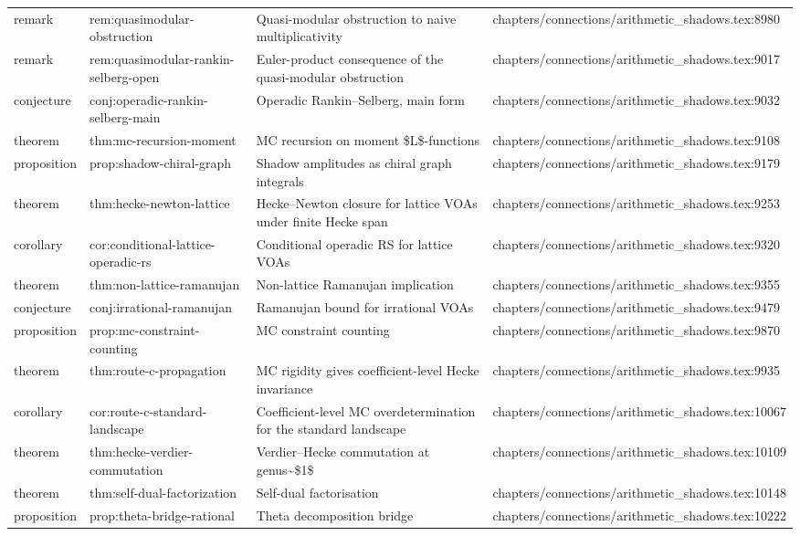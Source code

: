 \documentclass[11pt]{article}
\begin{document}
\begin{longtable}{L{0.10\textwidth}L{0.26\textwidth}L{0.42\textwidth}L{0.22\textwidth}}
remark & rem:quasimodular-obstruction & Quasi-modular obstruction to naive multiplicativity & chapters/connections/arithmetic\_shadows.tex:8980\\
remark & rem:quasimodular-rankin-selberg-op{}en & Euler-product consequence of the quasi-modular obstruction & chapters/connections/arithmetic\_shadows.tex:9017\\
conjecture & conj:operadic-rankin-selberg-main & Operadic Rankin--Selberg, main form & chapters/connections/arithmetic\_shadows.tex:9032\\
theorem & thm:mc-recursion-moment & MC recursion on moment \$L\$-functions & chapters/connections/arithmetic\_shadows.tex:9108\\
proposition & prop:shadow-chiral-graph & Shadow amplitudes as chiral graph integrals & chapters/connections/arithmetic\_shadows.tex:9179\\
theorem & thm:hecke-newton-lattice & Hecke--Newton closure for lattice VOAs under finite Hecke span & chapters/connections/arithmetic\_shadows.tex:9253\\
corollary & cor:cond{}itional-lattice-operadic-rs & Cond{}itional operadic RS for lattice VOAs & chapters/connections/arithmetic\_shadows.tex:9320\\
theorem & thm:non-lattice-ramanujan & Non-lattice Ramanujan implication & chapters/connections/arithmetic\_shadows.tex:9355\\
conjecture & conj:irrational-ramanujan & Ramanujan bound for irrational VOAs & chapters/connections/arithmetic\_shadows.tex:9479\\
proposition & prop:mc-constraint-counting & MC constraint counting & chapters/connections/arithmetic\_shadows.tex:9870\\
theorem & thm:route-c-propagation & MC rigidity gives coefficient-level Hecke invariance & chapters/connections/arithmetic\_shadows.tex:9935\\
corollary & cor:route-c-standard-landscape & Coefficient-level MC overdetermination for the standard landscape & chapters/connections/arithmetic\_shadows.tex:10067\\
theorem & thm:hecke-verdier-commutation & Verdier--Hecke commutation at genus\textasciitilde{}\$1\$ & chapters/connections/arithmetic\_shadows.tex:10109\\
theorem & thm:self-dual-factorization & Self-dual factorisation & chapters/connections/arithmetic\_shadows.tex:10148\\
proposition & prop:theta-bridge-rational & Theta decomposition bridge & chapters/connections/arithmetic\_shadows.tex:10222\\

\end{longtable}
\end{document}
